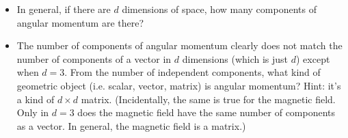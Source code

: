 \documentclass[fleqn]{article}
\begin{document}
\begin{enumerate}
\begin{itemize}
      \item In general, if there are $d$ dimensions of space, how many components of angular momentum are there?


      \item The number of components of angular momentum clearly does not match the number of components of a vector in $d$ dimensions
      (which is just $d$) except when $d=3$. From the number of independent components, what kind of geometric object (i.e. scalar,
      vector, matrix) is angular momentum?
      Hint: it’s a kind of $d \times d$ matrix. (Incidentally, the same is true for the magnetic field. Only 
      in $d=3$ does the magnetic field have the same number of components as a vector. In general, the magnetic field is a matrix.)
  
    \end{itemize}
    
  \end{enumerate}
\end{document}
